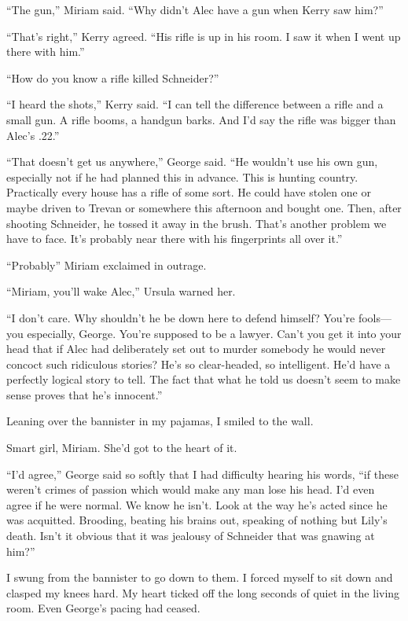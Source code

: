\documentclass{novel}
\begin{document}
“The gun,” Miriam said. “Why didn’t Alec have a gun when Kerry saw him?”

“That’s right,” Kerry agreed. “His rifle is up in his room. I saw it when I went up there with him.”

“How do you know a rifle killed Schneider?”

\scenestars

“I heard the shots,” Kerry said. “I can tell the difference between a rifle and a small gun. A rifle booms, a handgun barks. And I’d say the rifle was bigger than Alec’s .22.”

“That doesn’t get us anywhere,” George said. “He wouldn’t use his own gun, especially not if he had planned this in advance. This is hunting country. Practically every house has a rifle of some sort. He could have stolen one or maybe driven to Trevan or somewhere this afternoon and bought one. Then, after shooting Schneider, he tossed it away in the brush. That’s another problem we have to face. It’s probably near there with his fingerprints all over it.”

“Probably” Miriam exclaimed in outrage.

“Miriam, you’ll wake Alec,” Ursula warned her.

“I don’t care. Why shouldn’t he be down here to defend himself? You’re fools—you especially, George. You’re supposed to be a lawyer. Can’t you get it into your head that if Alec had deliberately set out to murder somebody he would never concoct such ridiculous stories? He’s so clear-headed, so intelligent. He’d have a perfectly logical story to tell. The fact that what he told us doesn’t seem to make sense proves that he’s innocent.”

Leaning over the bannister in my pajamas, I smiled to the wall. 

Smart girl, Miriam. She’d got to the heart of it.

“I’d agree,” George said so softly that I had difficulty hearing his words, “if these weren’t crimes of passion which would make any man lose his head. I’d even agree if he were normal. We know he isn’t. Look at the way he’s acted since he was acquitted. Brooding, beating his brains out, speaking of nothing but Lily’s death. Isn’t it obvious that it was jealousy of Schneider that was gnawing at him?”

I swung from the bannister to go down to them. I forced myself to sit down and clasped my knees hard. My heart ticked off the long seconds of quiet in the living room. Even George’s pacing had ceased.
\end{document}
